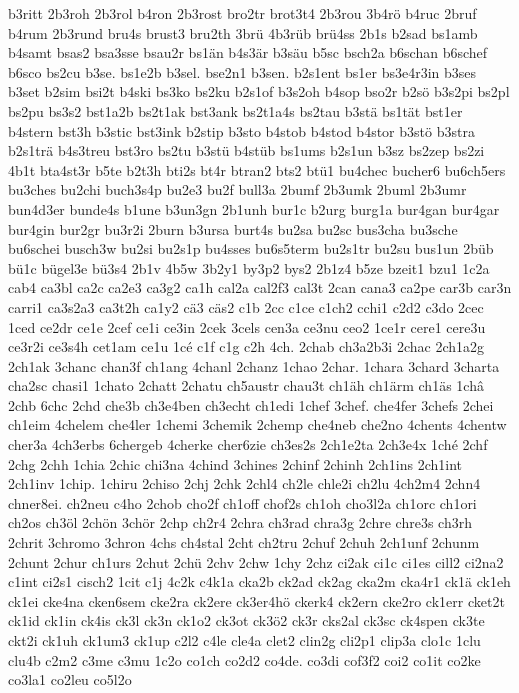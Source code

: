 {b3ritt
2b3roh
2b3rol
b4ron
2b3rost
bro2tr
brot3t4
2b3rou
3b4rö
b4ruc
2bruf
b4rum
2b3rund
bru4s
brust3
bru2th
3brü
4b3rüb
brü4ss
2b1s
b2sad
bs1amb
b4samt
bsas2
bsa3sse
bsau2r
bs1än
b4s3är
b3säu
b5sc
bsch2a
b6schan
b6schef
b6sco
bs2cu
b3se.
bs1e2b
b3sel.
bse2n1
b3sen.
b2s1ent
bs1er
bs3e4r3in
b3ses
b3set
b2sim
bsi2t
b4ski
bs3ko
bs2ku
b2s1of
b3s2oh
b4sop
bso2r
b2sö
b3s2pi
bs2pl
bs2pu
bs3s2
bst1a2b
bs2t1ak
bst3ank
bs2t1a4s
bs2tau
b3stä
bs1tät
bst1er
b4stern
bst3h
b3stic
bst3ink
b2stip
b3sto
b4stob
b4stod
b4stor
b3stö
b3stra
b2s1trä
b4s3treu
bst3ro
bs2tu
b3stü
b4stüb
bs1ums
b2s1un
b3sz
bs2zep
bs2zi
4b1t
bta4st3r
b5te
b2t3h
bti2s
bt4r
btran2
bts2
btü1
bu4chec
bucher6
bu6ch5ers
bu3ches
bu2chi
buch3s4p
bu2e3
bu2f
bull3a
2bumf
2b3umk
2buml
2b3umr
bun4d3er
bunde4s
b1une
b3un3gn
2b1unh
bur1c
b2urg
burg1a
bur4gan
bur4gar
bur4gin
bur2gr
bu3r2i
2burn
b3ursa
burt4s
bu2sa
bu2sc
bus3cha
bu3sche
bu6schei
busch3w
bu2si
bu2s1p
bu4sses
bu6s5term
bu2s1tr
bu2su
bus1un
2büb
bü1c
bügel3e
bü3s4
2b1v
4b5w
3b2y1
by3p2
bys2
2b1z4
b5ze
bzeit1
bzu1
1c2a
cab4
ca3bl
ca2c
ca2e3
ca3g2
ca1h
cal2a
cal2f3
cal3t
2can
cana3
ca2pe
car3b
car3n
carri1
ca3s2a3
ca3t2h
ca1y2
cä3
cäs2
c1b
2cc
c1ce
c1ch2
cchi1
c2d2
c3do
2cec
1ced
ce2dr
ce1e
2cef
ce1i
ce3in
2cek
3cels
cen3a
ce3nu
ceo2
1ce1r
cere1
cere3u
ce3r2i
ce3s4h
cet1am
ce1u
1cé
c1f
c1g
c2h
4ch.
2chab
ch3a2b3i
2chac
2ch1a2g
2ch1ak
3chanc
chan3f
ch1ang
4chanl
2chanz
1chao
2char.
1chara
3chard
3charta
cha2sc
chasi1
1chato
2chatt
2chatu
ch5austr
chau3t
ch1äh
ch1ärm
ch1äs
1châ
2chb
6chc
2chd
che3b
ch3e4ben
ch3echt
ch1edi
1chef
3chef.
che4fer
3chefs
2chei
ch1eim
4chelem
che4ler
1chemi
3chemik
2chemp
che4neb
che2no
4chents
4chentw
cher3a
4ch3erbs
6chergeb
4cherke
cher6zie
ch3es2s
2ch1e2ta
2ch3e4x
1ché
2chf
2chg
2chh
1chia
2chic
chi3na
4chind
3chines
2chinf
2chinh
2ch1ins
2ch1int
2ch1inv
1chip.
1chiru
2chiso
2chj
2chk
2chl4
ch2le
chle2i
ch2lu
4ch2m4
2chn4
chner8ei.
ch2neu
c4ho
2chob
cho2f
ch1off
chof2s
ch1oh
cho3l2a
ch1orc
ch1ori
ch2os
ch3öl
2chön
3chör
2chp
ch2r4
2chra
ch3rad
chra3g
2chre
chre3s
ch3rh
2chrit
3chromo
3chron
4chs
ch4stal
2cht
ch2tru
2chuf
2chuh
2ch1unf
2chunm
2chunt
2chur
ch1urs
2chut
2chü
2chv
2chw
1chy
2chz
ci2ak
ci1c
ci1es
cill2
ci2na2
c1int
ci2s1
cisch2
1cit
c1j
4c2k
c4k1a
cka2b
ck2ad
ck2ag
cka2m
cka4r1
ck1ä
ck1eh
ck1ei
cke4na
cken6sem
cke2ra
ck2ere
ck3er4hö
ckerk4
ck2ern
cke2ro
ck1err
cket2t
ck1id
ck1in
ck4is
ck3l
ck3n
ck1o2
ck3ot
ck3ö2
ck3r
cks2al
ck3sc
ck4spen
ck3te
ckt2i
ck1uh
ck1um3
ck1up
c2l2
c4le
cle4a
clet2
clin2g
cli2p1
clip3a
clo1c
1clu
clu4b
c2m2
c3me
c3mu
1c2o
co1ch
co2d2
co4de.
co3di
cof3f2
coi2
co1it
co2ke
co3la1
co2leu
co5l2o
}
